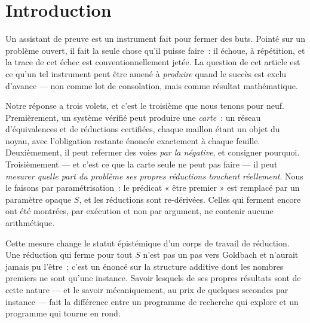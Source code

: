 \documentclass[11pt]{article}
\theoremstyle{remark}\newtheorem{remarque}{Remarque}
\begin{document}
\section{Introduction}

Un assistant de preuve est un instrument fait pour fermer des buts. Pointé sur un
problème ouvert, il fait la seule chose qu'il puisse faire~: il échoue, à répétition, et
la trace de cet échec est conventionnellement jetée. La question de cet article est ce
qu'un tel instrument peut être amené à \emph{produire} quand le succès est exclu
d'avance --- non comme lot de consolation, mais comme résultat mathématique.

Notre réponse a trois volets, et c'est le troisième que nous tenons pour neuf.
Premièrement, un système vérifié peut produire une \emph{carte}~: un réseau
d'équivalences et de réductions certifiées, chaque maillon étant un objet du noyau, avec
l'obligation restante énoncée exactement à chaque feuille. Deuxièmement, il peut refermer
des voies \emph{par la négative}, et consigner pourquoi. Troisièmement --- et c'est ce
que la carte seule ne peut pas faire --- il peut \emph{mesurer quelle part du problème ses
propres réductions touchent réellement}. Nous le faisons par paramétrisation~: le
prédicat « être premier » est remplacé par un paramètre opaque $S$, et les réductions
sont re-dérivées. Celles qui ferment encore ont été montrées, par exécution et non par
argument, ne contenir aucune arithmétique.

Cette mesure change le statut épistémique d'un corps de travail de réduction. Une
réduction qui ferme pour tout $S$ n'est pas un pas vers Goldbach et n'aurait jamais pu
l'être~; c'est un énoncé sur la structure additive dont les nombres premiers ne sont
qu'une instance. Savoir lesquels de ses propres résultats sont de cette nature --- et le
savoir mécaniquement, au prix de quelques secondes par instance --- fait la différence
entre un programme de recherche qui explore et un programme qui tourne en rond.
\end{document}
